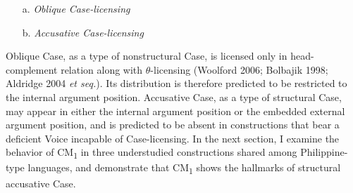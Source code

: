 \documentclass[10pt]{article}
\begin{document}
\begin{exe}
\ex
\begin{minipage}[t]{.4\textwidth}
\begin{enumerate}
\item[a.] \textit{Oblique Case-licensing}\vspace{+2mm} \\
    \end{enumerate}
\end{minipage}%
\begin{minipage}[t]{.4\textwidth}
\begin{enumerate}
 \item[b.] \textit{Accusative Case-licensing}\vspace{+2mm}\\
    \end{enumerate}
    
\end{minipage}%

\end{exe}

\bigskip

Oblique Case, as a type of nonstructural Case, is licensed only in head-complement relation along with $\theta$-licensing (Woolford 2006; Bolbajik 1998; Aldridge 2004 \textit{et seq.}). Its distribution is therefore predicted to be restricted to the internal argument position. Accusative Case, as a type of structural Case, may appear in either the internal argument position or the embedded external argument position, and is predicted to be absent in constructions that bear a deficient Voice incapable of Case-licensing. In the next section, I examine the behavior of CM\textsubscript{1} in three understudied constructions shared among Philippine-type languages, and demonstrate that CM\textsubscript{1} shows the hallmarks of structural accusative Case.
\end{document}
